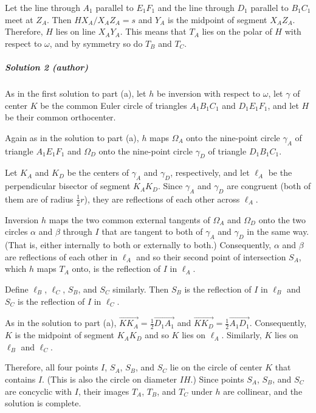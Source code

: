 Let the line through $A_1$ parallel to $E_1F_1$ and the line through $D_1$
parallel to $B_1C_1$ meet at $Z_A$. Then $HX_A/X_AZ_A=s$
and $Y_A$ is the midpoint of segment $X_AZ_A$. Therefore, $H$ lies on
line $X_AY_A$. This means that $T_A$ lies on the polar of $H$ with respect to
$\omega$, and by symmetry so do $T_B$ and $T_C$.


\subparagraph{Solution 2 (author)}

As in the first solution to part (a), let
$h$ be inversion with respect to $\omega$, let $\gamma$ of center $K$ be the common
Euler circle of triangles $A_1B_1C_1$ and $D_1E_1F_1$, and let $H$ be their
common orthocenter.

Again as in the solution to part (a), $h$ maps $\Omega_A$ onto the nine-point
circle $\gamma_A$ of triangle $A_1E_1F_1$ and $\Omega_D$ onto the nine-point
circle $\gamma_D$ of triangle $D_1B_1C_1$.

Let $K_A$ and $K_D$ be the centers of $\gamma_A$ and $\gamma_D$, respectively,
and let $\ell_A$ be the perpendicular bisector of segment $K_AK_D$. Since
$\gamma_A$ and $\gamma_D$ are congruent (both of them are of radius
$\frac{1}{2}r$), they are reflections of each other across $\ell_A$.

Inversion $h$ maps the two common external tangents of $\Omega_A$ and $\Omega_D$
onto the two circles $\alpha$ and $\beta$ through $I$ that are tangent to both
of $\gamma_A$ and $\gamma_D$ in the same way. (That is, either internally to both or
externally to both.) Consequently, $\alpha$ and $\beta$ are reflections of each
other in $\ell_A$ and so their second point of intersection $S_A$, which $h$
maps $T_A$ onto, is the reflection of $I$ in $\ell_A$.

Define $\ell_B$, $\ell_C$, $S_B$, and $S_C$ similarly. Then $S_B$ is the reflection of $I$ in $\ell_B$ and $S_C$ is the reflection of $I$ in $\ell_C$.

As in the solution to part (a),
$\overrightarrow{KK_A}=\frac{1}{2}\overrightarrow{D_1A_1}$ and
$\overrightarrow{KK_D}=\frac{1}{2}\overrightarrow{A_1D_1}$. Consequently, $K$ is
the midpoint of segment $K_AK_D$ and so $K$ lies on $\ell_A$. Similarly, $K$
lies on $\ell_B$ and $\ell_C$.

Therefore, all four points $I$, $S_A$, $S_B$, and $S_C$ lie on the circle of center $K$ that contains $I$. (This is also the circle on diameter $IH$.) Since points $S_A$, $S_B$, and $S_C$ are concyclic with $I$, their images $T_A$, $T_B$, and $T_C$ under $h$ are collinear, and the solution is complete.

